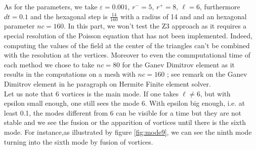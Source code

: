 \documentclass[proc]{edpsmath}
\begin{document}
\noindent As for the parameters, we take $\varepsilon=0.001$, $r^-=5$, $r^+=8$, $\ell=6$, furthermore $dt=0.1$ and the hexagonal step is $\frac{14}{160}$ with a radius of 14 and and an hexagonal parameter $nc =160$.
In this part, we won't test the Z3 approach as it requires a special resolution of the Poisson equation that has not been implemented. Indeed, computing the values of the field at the center of the triangles can't be combined with the resolution at the vertices. 
Moreover to even the commputational time of each method we chose to take $nc=80$ for the Ganev Dimitrov element as it results in the computations on a mesh with $nc =160$ ; see remark on the Ganev Dimitrov element in he paragraph on Hermite Finite element solver.\\
Let us note that 6 vortices is the main mode. If one takes $\ell\neq6$, but with epsilon small enough, one still sees the mode 6. With epsilon big enough, i.e. at least 0.1, the modes different from 6 can be visible for a time but they are not stable and we see the fusion or the apparition of vortices until there is the sixth mode. For instance,as illustrated by figure \ref{fig:mode9}, we can see the ninth mode turning into the sixth mode by fusion of vortices.
\end{document}

